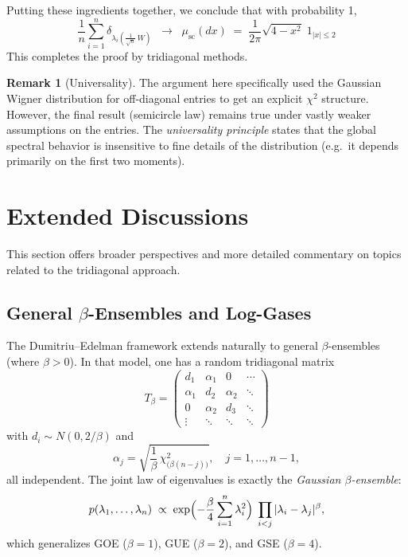 \documentclass[letterpaper,11pt,oneside,reqno]{article}
\numberwithin{equation}{section}
\theoremstyle{definition}
\newtheorem{remark}[proposition]{Remark}
\begin{document}
Putting these ingredients together, we conclude that with probability 1,
\[
  \frac{1}{n}\sum_{i=1}^n \delta_{\lambda_i(\frac1{\sqrt{n}}\,W)}
  \;\;\longrightarrow\;\;
  \mu_{\mathrm{sc}}(dx) \;=\; \frac{1}{2\pi}\sqrt{4-x^2}\; 1_{|x|\le2}
\]
This completes the proof by tridiagonal methods.

\begin{remark}[Universality]
The argument here specifically used the Gaussian Wigner distribution for off-diagonal entries to get an explicit $\chi^2$ structure. However, the final result (semicircle law) remains true under vastly weaker assumptions on the entries. The \emph{universality principle} states that the global spectral behavior is insensitive to fine details of the distribution (e.g.\ it depends primarily on the first two moments).
\end{remark}

\section{Extended Discussions}
\label{sec:extended-discussion}

This section offers broader perspectives and more detailed commentary on topics related to the tridiagonal approach.

\subsection{General \texorpdfstring{$\beta$}{beta}-Ensembles and Log-Gases}

The Dumitriu--Edelman framework extends naturally to general $\beta$-ensembles (where $\beta>0$). In that model, one has a random tridiagonal matrix
\[
  T_\beta
  =
  \begin{pmatrix}
   d_1 & \alpha_1 & 0 & \cdots \\
   \alpha_1 & d_2 & \alpha_2 & \ddots \\
   0 & \alpha_2 & d_3 & \ddots \\
   \vdots & \ddots & \ddots & \ddots
  \end{pmatrix}
\]
with $d_i \sim N(0,2/\beta)$ and
\[
  \alpha_j
  = \sqrt{\frac{1}{\beta}\,\chi^2_{\bigl(\beta(n-j)\bigr)}},
  \quad j=1,\ldots,n-1,
\]
all independent. The joint law of eigenvalues is exactly the \emph{Gaussian $\beta$-ensemble}:
\[
  p(\lambda_1,\dots,\lambda_n)
  \;\propto\;
  \exp\Bigl(-\frac{\beta}{4}\sum_{i=1}^n \lambda_i^2\Bigr)
  \;\prod_{i<j}|\lambda_i - \lambda_j|^\beta,
\]
which generalizes GOE ($\beta=1$), GUE ($\beta=2$), and GSE ($\beta=4$).
\end{document}

